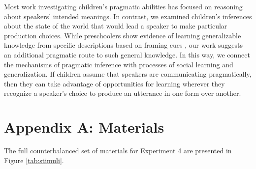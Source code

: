 \documentclass[man]{apa2}
\begin{document}
Most work investigating children's pragmatic abilities has focused on reasoning about speakers' intended meanings. In contrast, we examined children's inferences about the state of the world that would lead a speaker to make particular production choices. While preschoolers show evidence of learning generalizable knowledge from specific descriptions based on framing cues \cite{cimpian2009}, our work suggests an additional pragmatic route to such general knowledge. In this way, we connect the mechanisms of pragmatic inference with processes of social learning and generalization. If children assume that speakers are communicating pragmatically, then they can take advantage of opportunities for learning wherever they recognize a speaker's choice to produce an utterance in one form over another. 







\newpage
\theappendix 

\section{Appendix A: Materials}

The full counterbalanced set of materials for Experiment 4 are presented in Figure \ref{tab:stimuli}. 


%
%
\end{document}
